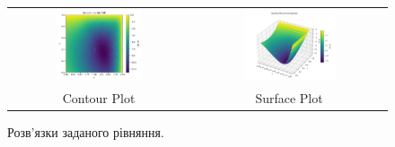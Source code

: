 \documentclass[14pt]{extarticle}
\begin{document}
\begin{figure}[H]
    \begin{tabular}{cc}
      \includegraphics[width=0.5\textwidth]{appendices/homework_3/contour_plot.pdf} &   \includegraphics[width=0.5\textwidth]{appendices/homework_3/surface_plot.pdf} \\
      Contour Plot & Surface Plot
    \end{tabular}
    \caption{Розв'язки заданого рівняння.}
    \label{fig:with_friction}
\end{figure}
\end{document}
